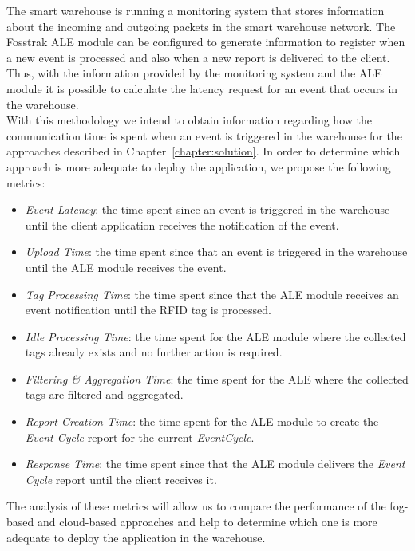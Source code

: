 The smart warehouse is running a monitoring system that stores information about the incoming and outgoing
packets in the smart warehouse network. The Fosstrak \gls{ALE} module can be configured to generate
information to register when a new event is processed and also when a new report is delivered to the
client. Thus, with the information provided by the monitoring system and the \gls{ALE} module it is
possible to calculate the latency request for an event that occurs in the warehouse.\\

With this methodology we intend to obtain information regarding how the communication time is spent
when an event is triggered in the warehouse for the approaches described in Chapter~\ref{chapter:solution}.
In order to determine which approach is more adequate to deploy the application, we propose the
following metrics:

\begin{itemize}
  \item \textit{Event Latency}: the time spent since an event is triggered in the warehouse until
  the client application receives the notification of the event.
  \item \textit{Upload Time}: the time spent since that an event is triggered in the warehouse until
  the \gls{ALE} module receives the event.
  \item \textit{Tag Processing Time}: the time spent since that the \gls{ALE} module receives an event
  notification until the \gls{RFID} tag is processed.
  \item \textit{Idle Processing Time}: the time spent for the \gls{ALE} module where the collected
  tags already exists and no further action is required.
  \item \textit{Filtering \& Aggregation Time}: the time spent for the \gls{ALE} where the
  collected tags are filtered and aggregated.
  \item \textit{Report Creation Time}: the time spent for the \gls{ALE} module to create the
  \textit{Event Cycle} report for the current \textit{EventCycle}.
  \item \textit{Response Time}: the time spent since that the \gls{ALE} module delivers the
  \textit{Event Cycle} report until the client receives it.
\end{itemize}

The analysis of these metrics will allow us to compare the performance of the fog-based and cloud-based
approaches and help to determine which one is more adequate to deploy the application in the warehouse.

